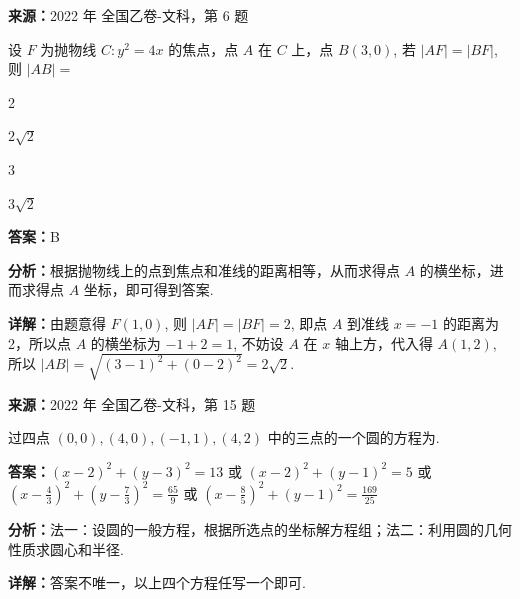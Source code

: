 \begin{question}[points=5]
\textbf{来源：}2022 年 全国乙卷-文科，第 6 题\par
设 $F$ 为抛物线 $C: y^2=4x$ 的焦点，点 $A$ 在 $C$ 上，点 $B(3,0)$, 若 $|AF| = |BF|$, 则 $|AB| =$
\begin{choices}
  \item 2
  \item $2\sqrt{2}$
  \item 3
  \item $3\sqrt{2}$
\end{choices}
\begin{solution}
\textbf{答案：}B

\textbf{分析：}根据抛物线上的点到焦点和准线的距离相等，从而求得点 $A$ 的横坐标，进而求得点 $A$ 坐标，即可得到答案.

\textbf{详解：}由题意得 $F(1,0)$, 则 $|AF|=|BF|=2$, 即点 $A$ 到准线 $x=-1$ 的距离为2，所以点 $A$ 的横坐标为 $-1+2=1$, 不妨设 $A$ 在 $x$ 轴上方，代入得 $A(1,2)$, 所以 $|AB|=\sqrt{(3-1)^2+(0-2)^2}=2\sqrt{2}$.
\end{solution}
\end{question}

\begin{question}[points=5]
\textbf{来源：}2022 年 全国乙卷-文科，第 15 题\par
过四点 $(0,0), (4,0), (-1,1), (4,2)$ 中的三点的一个圆的方程为.
\fillin[{$(x-2)^2+(y-3)^2=13$ 或 $(x-2)^2+(y-1)^2=5$ 或 $(x-\frac{4}{3})^2+(y-\frac{7}{3})^2=\frac{65}{9}$ 或 $(x-\frac{8}{5})^2+(y-1)^2=\frac{169}{25}$}]
\begin{solution}
\textbf{答案：}$(x-2)^2+(y-3)^2=13$ 或 $(x-2)^2+(y-1)^2=5$ 或 $(x-\frac{4}{3})^2+(y-\frac{7}{3})^2=\frac{65}{9}$ 或 $(x-\frac{8}{5})^2+(y-1)^2=\frac{169}{25}$

\textbf{分析：}法一：设圆的一般方程，根据所选点的坐标解方程组；法二：利用圆的几何性质求圆心和半径.

\textbf{详解：}答案不唯一，以上四个方程任写一个即可.
\end{solution}
\end{question}

